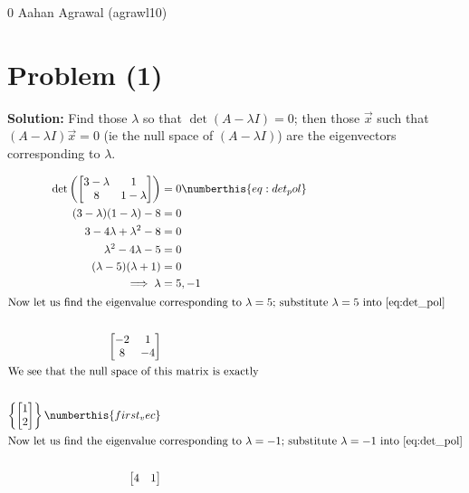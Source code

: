 \documentclass[../main.tex]{subfiles}
\begin{document}
\homework
    {0}
    {Aahan Agrawal (agrawl10)}
    {}

\section*{Problem (1)}
\renewcommand{\l}{\lambda}
\textbf{Solution:}
 Find those $\l$ so that $\det(A  - \l I) = 0$; then those
$\vec{x}$ such that $(A - \l I)\vec{x} = 0$ (ie the null space of $(A - \l I)$) are the
eigenvectors corresponding to $\l$.

\begin{align*}
    \det \left(
    \begin{bmatrix}
        3 - \l & 1 \\
        8 & 1 - \l \\
    \end{bmatrix} \right) &= 0 \numberthis{eq:det_pol}\\
    (3 - \l)(1 - \l) - 8 &= 0 \\
    3 - 4\l  + \l^2 - 8 &= 0 \\
    \l^2 - 4\l - 5 &= 0 \\
    (\l-5)(\l + 1) &= 0 \\
    \implies \l &= 5, -1 \\
    \intertext{Now let us find the eigenvalue corresponding to $\l = 5$; substitute $\l = 5$ into \eqref{eq:det_pol}} \\
    \begin{bmatrix}
        -2 & 1 \\
        8 & -4 \\
    \end{bmatrix} \\
    \intertext{We see that the null space of this matrix is exactly} \\
    \left\{ \begin{bmatrix}
        1 \\
        2 \\
    \end{bmatrix} \right\} \numberthis{first_vec} \\
    \intertext{Now let us find the eigenvalue corresponding to $\l = -1$; substitute $\l = -1$ into \eqref{eq:det_pol}} \\
    \begin{bmatrix}
        4 & 1 \\

\end{bmatrix}
\end{align*}
\end{document}

